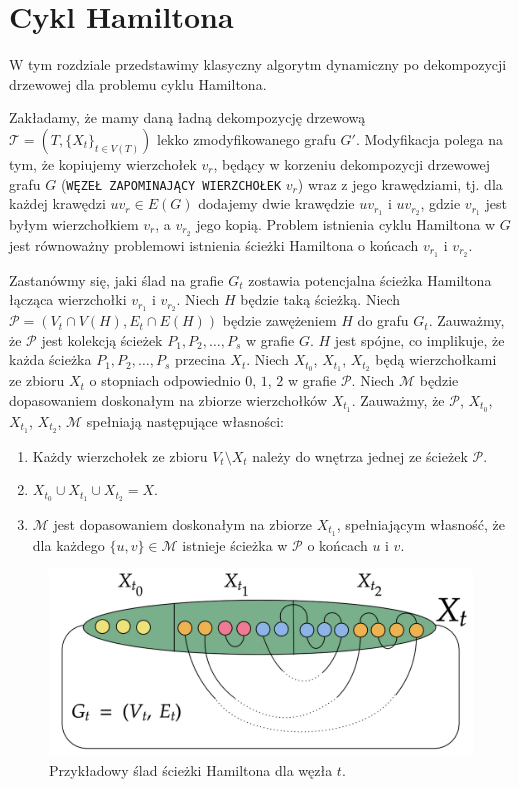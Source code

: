 \documentclass[12pt, oneside]{report}
\begin{document}
    	\section{Cykl Hamiltona}
    	
W tym rozdziale przedstawimy klasyczny algorytm dynamiczny po dekompozycji drzewowej dla problemu cyklu Hamiltona. 

Zakładamy, że mamy daną ładną dekompozycję drzewową $\mathcal{T} = (T, \{X_t\}_{t \in V(T)})$ lekko zmodyfikowanego grafu $G'$. Modyfikacja polega na tym, że kopiujemy wierzchołek $v_r$, będący w korzeniu dekompozycji drzewowej grafu $G$ (\texttt{WĘZEŁ ZAPOMINAJĄCY WIERZCHOŁEK} $v_r$) wraz z jego krawędziami, tj. dla każdej krawędzi $uv_r \in E(G)$ dodajemy dwie krawędzie $uv_{r_1}$ i $uv_{r_2}$, gdzie $v_{r_1}$ jest byłym wierzchołkiem $v_r$, a $v_{r_2}$ jego kopią. Problem istnienia cyklu Hamiltona w $G$ jest równoważny problemowi istnienia ścieżki Hamiltona o końcach $v_{r_1}$ i $v_{r_2}$.

Zastanówmy się, jaki ślad na grafie $G_t$ zostawia potencjalna ścieżka Hamiltona łącząca wierzchołki $v_{r_1}$ i $v_{r_2}$. Niech $H$ będzie taką ścieżką. Niech $\mathcal{P} = (V_t \cap V(H), E_t \cap E(H))$ będzie zawężeniem $H$ do grafu $G_t$. Zauważmy, że $\mathcal{P}$ jest kolekcją ścieżek $P_1, P_2, \ldots, P_s$ w grafie $G$. $H$ jest spójne, co implikuje, że każda ścieżka $P_1, P_2, \ldots, P_s$ przecina $X_t$. Niech $X_{t_0}$, $X_{t_1}$, $X_{t_2}$ będą wierzchołkami ze zbioru $X_t$ o stopniach odpowiednio $0$, $1$, $2$ w grafie $\mathcal{P}$. Niech $\mathcal{M}$ będzie dopasowaniem doskonałym na zbiorze wierzchołków $X_{t_1}$. Zauważmy, że $\mathcal{P}$, $X_{t_0}$, $X_{t_1}$, $X_{t_2}$, $\mathcal{M}$ spełniają następujące własności:
\begin{enumerate}[label=(\roman*)]
\item \label{i}{Każdy wierzchołek ze zbioru $V_t \setminus X_t$ należy do wnętrza jednej ze ścieżek $\mathcal{P}$.}
\item{$X_{t_0} \cup X_{t_1} \cup X_{t_2} = X$.}
\item \label{iii}{$\mathcal{M}$ jest dopasowaniem doskonałym na zbiorze $X_{t_1}$, spełniającym własność, że dla każdego $\{u, v\} \in \mathcal{M}$ istnieje ścieżka w $\mathcal{P}$ o końcach $u$ i $v$.}
\end{enumerate} 

\begin{figure}
\centering
\includegraphics[width=16cm]{hamiltonian.png}
\caption{Przykładowy ślad ścieżki Hamiltona dla węzła $t$.}
\label{hamiltonian}
\end{figure} 
\end{document}
